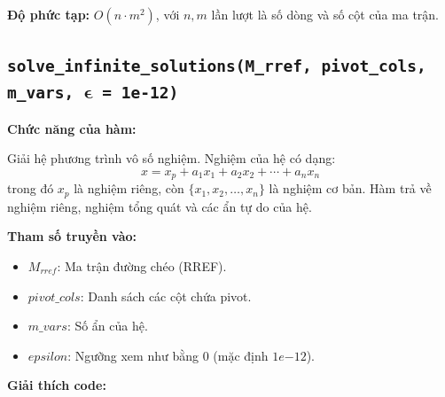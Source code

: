 \documentclass[a4paper,12pt]{report}
\begin{document}
\noindent\textbf{Độ phức tạp:} $O(n \cdot m^2)$, với $n, m$ lần lượt là số dòng và số cột của ma trận.

\subsection[solve\_infinite\_solutions(M\_rref, pivot\_cols, m\_vars, $\boldsymbol{\epsilon}$ = 1e-12)]{\texttt{solve\_infinite\_solutions(M\_rref, pivot\_cols, m\_vars, $\boldsymbol{\epsilon}$ = 1e-12)}}

\textbf{Chức năng của hàm:}

Giải hệ phương trình vô số nghiệm. Nghiệm của hệ có dạng:
\[
x = x_p + a_1 x_1 + a_2 x_2 + \cdots + a_n x_n
\]
trong đó $x_p$ là nghiệm riêng, còn $\{x_1, x_2, \ldots, x_n\}$ là nghiệm cơ bản. Hàm trả về nghiệm riêng, nghiệm tổng quát và các ẩn tự do của hệ.

\smallskip

\noindent\textbf{Tham số truyền vào:}
\begin{itemize}
    \item $M_{rref}$: Ma trận đường chéo (RREF).
    \item $pivot\_cols$: Danh sách các cột chứa pivot.
    \item $m\_vars$: Số ẩn của hệ.
    \item $epsilon$: Ngưỡng xem như bằng 0 (mặc định $1e{-12}$).
\end{itemize}

\smallskip

\noindent\textbf{Giải thích code:}
\end{document}
